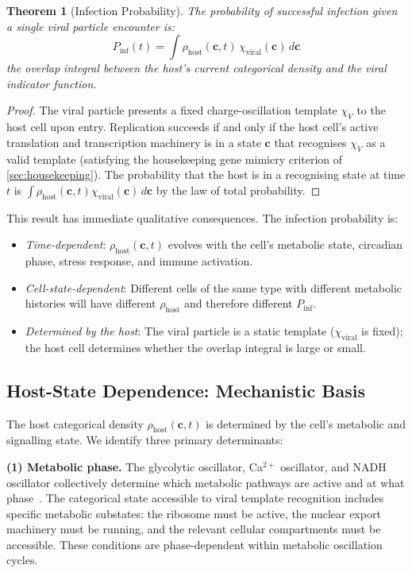 \documentclass[12pt,a4paper]{article}
\newtheorem{theorem}{Theorem}[section]
\theoremstyle{definition}
\theoremstyle{remark}
\newcommand{\Phost}{\rho_{\mathrm{host}}}
\newcommand{\chiviral}{\chi_{\mathrm{viral}}}
\newcommand{\vv}[1]{\boldsymbol{#1}}
\begin{document}
\begin{theorem}[Infection Probability]
\label{thm:infection_prob}
The probability of successful infection given a single viral particle encounter is:
\begin{equation}
  P_{\mathrm{inf}}(t) = \int \Phost(\vv{c}, t)\, \chiviral(\vv{c})\,d\vv{c}
  \label{eq:infection_prob}
\end{equation}
the overlap integral between the host's current categorical density and the viral indicator function.
\end{theorem}

\begin{proof}
The viral particle presents a fixed charge-oscillation template $\chi_V$ to the host cell upon entry. Replication succeeds if and only if the host cell's active translation and transcription machinery is in a state $\vv{c}$ that recognises $\chi_V$ as a valid template (satisfying the housekeeping gene mimicry criterion of \cref{sec:housekeeping}). The probability that the host is in a recognising state at time $t$ is $\int \Phost(\vv{c},t) \chiviral(\vv{c})\,d\vv{c}$ by the law of total probability.
\end{proof}

This result has immediate qualitative consequences. The infection probability is:
\begin{itemize}
  \item \emph{Time-dependent}: $\Phost(\vv{c}, t)$ evolves with the cell's metabolic state, circadian phase, stress response, and immune activation.
  \item \emph{Cell-state-dependent}: Different cells of the same type with different metabolic histories will have different $\Phost$ and therefore different $P_{\mathrm{inf}}$.
  \item \emph{Determined by the host}: The viral particle is a static template ($\chiviral$ is fixed); the host cell determines whether the overlap integral is large or small.
\end{itemize}

\subsection{Host-State Dependence: Mechanistic Basis}

The host categorical density $\Phost(\vv{c}, t)$ is determined by the cell's metabolic and signalling state. We identify three primary determinants:

\textbf{(1) Metabolic phase.} The glycolytic oscillator, Ca$^{2+}$ oscillator, and NADH oscillator collectively determine which metabolic pathways are active and at what phase~\cite{Bhalla1999}. The categorical state accessible to viral template recognition includes specific metabolic substates: the ribosome must be active, the nuclear export machinery must be running, and the relevant cellular compartments must be accessible. These conditions are phase-dependent within metabolic oscillation cycles.
\end{document}

